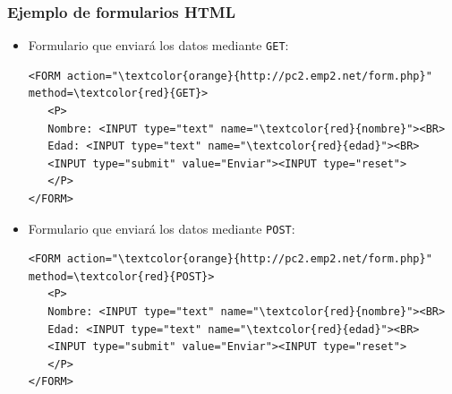 \documentclass[hyperref={pdfpagelabels=true},ucs]{beamer}
\begin{document}


\begin{frame}[fragile]
\frametitle{Ejemplo de formularios HTML}

\begin{itemize}
\item Formulario que enviará los datos mediante \Verb|GET|:
\begin{scriptsize}
\begin{Verbatim}
<FORM action="\textcolor{orange}{http://pc2.emp2.net/form.php}" method=\textcolor{red}{GET}>
   <P>
   Nombre: <INPUT type="text" name="\textcolor{red}{nombre}"><BR>
   Edad: <INPUT type="text" name="\textcolor{red}{edad}"><BR>
   <INPUT type="submit" value="Enviar"><INPUT type="reset">
   </P>
</FORM>
\end{Verbatim}
\end{scriptsize}

\item Formulario que enviará los datos mediante \Verb|POST|:
\begin{scriptsize}
\begin{Verbatim}
<FORM action="\textcolor{orange}{http://pc2.emp2.net/form.php}" method=\textcolor{red}{POST}>
   <P>
   Nombre: <INPUT type="text" name="\textcolor{red}{nombre}"><BR>
   Edad: <INPUT type="text" name="\textcolor{red}{edad}"><BR>
   <INPUT type="submit" value="Enviar"><INPUT type="reset">
   </P>
</FORM>
\end{Verbatim}
\end{scriptsize}

\end{itemize}

\end{frame}

\end{document}

